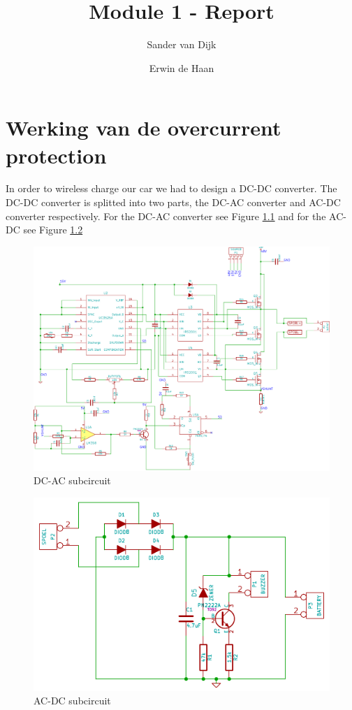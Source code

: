 \documentclass[final]{scrreprt} %
\title{Module 1 - Report}
\author{Sander {van Dijk} \and Erwin {de Haan}}
\begin{document}
\chapter{Werking van de overcurrent protection}
In order to wireless charge our car we had to design a DC-DC converter. The DC-DC converter is splitted into two parts, the DC-AC converter and AC-DC converter respectively. For the DC-AC converter see Figure \ref{fig:DC-AC} and for the AC-DC see Figure \ref{fig:AC-DC}

\begin{figure}[h]
	\includegraphics[width=\linewidth]{resources/DC-AC-rc.pdf}
	\caption{DC-AC subcircuit}
	\label{fig:DC-AC}
\end{figure}

\begin{figure}[h]
	\includegraphics[width=\linewidth]{resources/AC-DC-rc.pdf}
	\caption{AC-DC subcircuit}
	\label{fig:AC-DC}
\end{figure}
\end{document}
